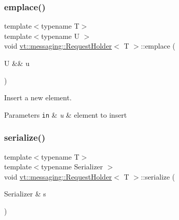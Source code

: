 \subsubsection{\texorpdfstring{emplace()}{emplace()}}
{\footnotesize\ttfamily template$<$typename T$>$ \\
template$<$typename U $>$ \\
void \hyperlink{structvt_1_1messaging_1_1_request_holder}{vt\+::messaging\+::\+Request\+Holder}$<$ T $>$\+::emplace (\begin{DoxyParamCaption}\item[{U \&\&}]{u }\end{DoxyParamCaption})\hspace{0.3cm}{\ttfamily [inline]}}



Insert a new element. 


\begin{DoxyParams}[1]{Parameters}
\mbox{\tt in}  & {\em u} & element to insert \\
\hline
\end{DoxyParams}
\mbox{\label{structvt_1_1messaging_1_1_request_holder_ae28c55a90b59c153d6ba72c875946f75}} 
\subsubsection{\texorpdfstring{serialize()}{serialize()}}
{\footnotesize\ttfamily template$<$typename T$>$ \\
template$<$typename Serializer $>$ \\
void \hyperlink{structvt_1_1messaging_1_1_request_holder}{vt\+::messaging\+::\+Request\+Holder}$<$ T $>$\+::serialize (\begin{DoxyParamCaption}\item[{Serializer \&}]{s }\end{DoxyParamCaption})\hspace{0.3cm}{\ttfamily [inline]}}

\mbox{\label{structvt_1_1messaging_1_1_request_holder_af8954465588ec05efb6ccba01041e114}} 
